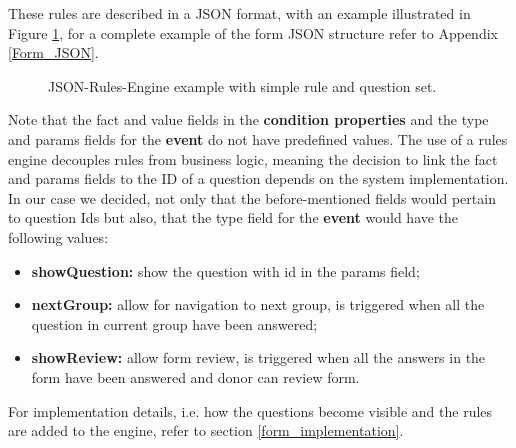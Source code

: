 These rules are described in a JSON format, with an example illustrated in Figure \ref{fig:jre_diagram}, for a complete example of the form JSON structure refer to Appendix \ref{Form_JSON}.

\begin{figure}[h]
	\begin{center}
	\end{center}
	\caption{JSON-Rules-Engine example with simple rule and question set.}\label{fig:jre_diagram}
\end{figure}

Note that the fact and value fields in the \textbf{condition properties} and the type and params fields for the \textbf{event} do not have predefined values. The use of a rules engine decouples rules from business logic, meaning the decision to link the fact and params fields to the ID of a question depends on the system implementation.
In our case we decided, not only that the before-mentioned fields would pertain to question Ids but also, that the type field for the \textbf{event} would have the following values:

\begin{itemize}
	\item \textbf{showQuestion:} show the question with id in the params field;
	\item \textbf{nextGroup:} allow for navigation to next group, is triggered when all the question in current group have been answered;
	\item \textbf{showReview:} allow form review, is triggered when all the answers in the form have been answered and donor can review form.
\end{itemize}

For implementation details, i.e. how the questions become visible and the rules are added to the engine, refer to section \ref{form_implementation}.
\newpage


